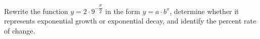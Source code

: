 Rewrite the function $y=2\cdot9^{-\dfrac{x}{2}}$ in the form $y=a\cdot b^x$, determine whether it represents exponential growth or exponential decay, and identify the percent rate of change.
